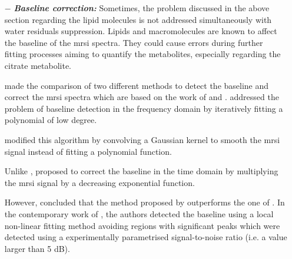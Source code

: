 \begin{enumerate}[leftmargin=*]
\item[$-$] \textbf{\textit{Baseline correction:}} Sometimes, the problem discussed in the above section regarding the lipid molecules is not addressed simultaneously with water residuals suppression. Lipids and macromolecules are known to affect the baseline of the \ac{mrsi} spectra. They could cause errors during further fitting processes aiming to quantify the metabolites, especially regarding the citrate metabolite.
	
\cite{Parfait2012} made the comparison of two different methods to detect the baseline and correct the \ac{mrsi} spectra which are based on the work of \cite{Lieber2003} and \cite{Devos2004}. \cite{Lieber2003} addressed the problem of baseline detection in the frequency domain by iteratively fitting a polynomial of low degree.%
%
%

\cite{Parfait2012} modified this algorithm by convolving a Gaussian kernel to smooth the \ac{mrsi} signal instead of fitting a polynomial function.%

Unlike \cite{Lieber2003}, \cite{Devos2004} proposed to correct the baseline in the time domain by multiplying the \ac{mrsi} signal by a decreasing exponential function.%
%

However, \cite{Parfait2012} concluded that the method proposed by \cite{Lieber2003} outperforms the one of \cite{Devos2004}. In the contemporary work of \cite{Tiwari2012}, the authors detected the baseline using a local non-linear fitting method avoiding regions with significant peaks which were detected using a experimentally parametrised signal-to-noise ratio (i.e. a value larger than 5 dB).


\end{enumerate}
